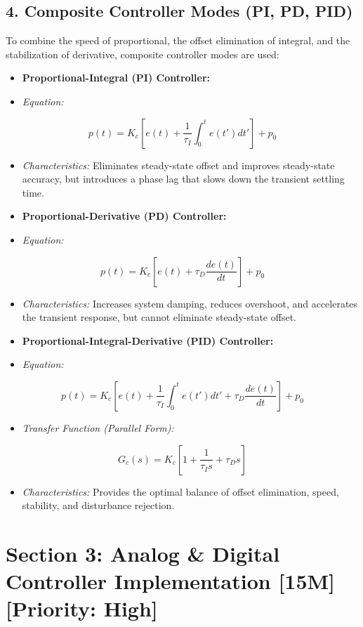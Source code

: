 \subsection{4. Composite Controller Modes (PI, PD, PID)}
To combine the speed of proportional, the offset elimination of integral, and the stabilization of derivative, composite controller modes are used:

\begin{itemize}
  \item \textbf{Proportional-Integral (PI) Controller:}
  \item \textit{Equation:}
\end{itemize}
    \[ p(t) = K_c \left[ e(t) + \frac{1}{\tau_I} \int_0^t e(t') dt' \right] + p_0 \]
\begin{itemize}
  \item \textit{Characteristics:} Eliminates steady-state offset and improves steady-state accuracy, but introduces a phase lag that slows down the transient settling time.
  \item \textbf{Proportional-Derivative (PD) Controller:}
  \item \textit{Equation:}
\end{itemize}
    \[ p(t) = K_c \left[ e(t) + \tau_D \frac{de(t)}{dt} \right] + p_0 \]
\begin{itemize}
  \item \textit{Characteristics:} Increases system damping, reduces overshoot, and accelerates the transient response, but cannot eliminate steady-state offset.
  \item \textbf{Proportional-Integral-Derivative (PID) Controller:}
  \item \textit{Equation:}
\end{itemize}
    \[ p(t) = K_c \left[ e(t) + \frac{1}{\tau_I} \int_0^t e(t') dt' + \tau_D \frac{de(t)}{dt} \right] + p_0 \]
\begin{itemize}
  \item \textit{Transfer Function (Parallel Form):}
\end{itemize}
    \[ G_c(s) = K_c \left[ 1 + \frac{1}{\tau_I s} + \tau_D s \right] \]
\begin{itemize}
  \item \textit{Characteristics:} Provides the optimal balance of offset elimination, speed, stability, and disturbance rejection.
\end{itemize}


\section{Section 3: Analog \& Digital Controller Implementation [15M] [Priority: High]}

